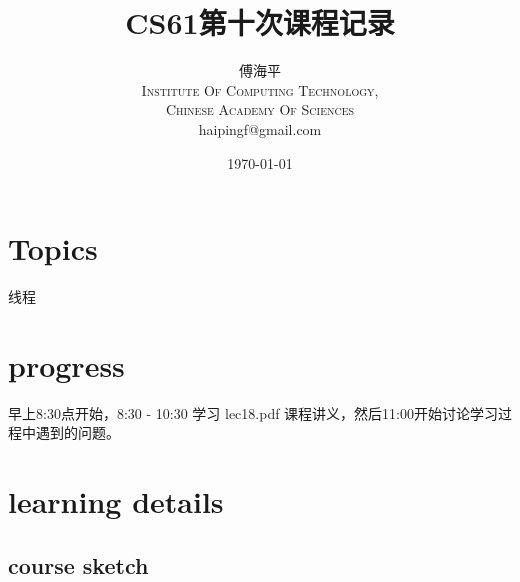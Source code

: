\documentclass[a4paper, 11pt]{article}
\title{CS61第十次课程记录}
\author{傅海平\\
\textsc{Institute Of Computing Technology,}\\
\textsc{Chinese Academy Of Sciences}\\
haipingf@gmail.com\\
}
\date{\today}
\begin{document}
\maketitle
\newpage
\tableofcontents
\newpage
\section{Topics}
\begin{center}
  \Large{线程}
\end{center}

\section{progress}
早上8:30点开始，8:30 - 10:30 学习 lec18.pdf 课程讲义，然后11:00开始讨论学习过程中遇到的问题。
\section{learning details}
\subsection{course sketch}
\end{document}
